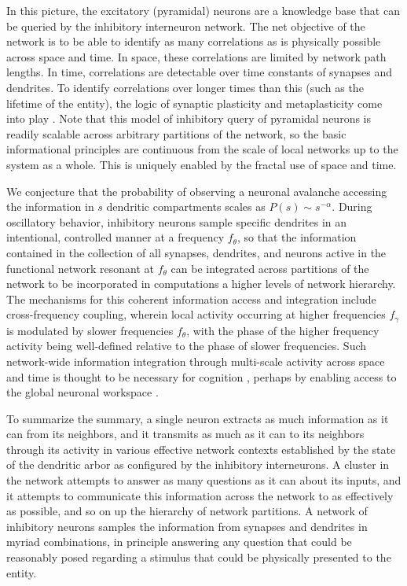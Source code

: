In this picture, the excitatory (pyramidal) neurons are a knowledge base that can be queried by the inhibitory interneuron network. The net objective of the network is to be able to identify as many correlations as is physically possible across space and time. In space, these correlations are limited by network path lengths. In time, correlations are detectable over time constants of synapses and dendrites. To identify correlations over longer times than this (such as the lifetime of the entity), the logic of synaptic plasticity and metaplasticity come into play \cite{fudr2005,fuab2007}. Note that this model of inhibitory query of pyramidal neurons is readily scalable across arbitrary partitions of the network, so the basic informational principles are continuous from the scale of local networks up to the system as a whole. This is uniquely enabled by the fractal use of space and time.

We conjecture that the probability of observing a neuronal avalanche accessing the information in $s$ dendritic compartments scales as $P(s)\sim s^{-\alpha}$. During oscillatory behavior, inhibitory neurons sample specific dendrites in an intentional, controlled manner at a frequency $f_{\theta}$, so that the information contained in the collection of all synapses, dendrites, and neurons active in the functional network resonant at $f_{\theta}$ can be integrated across partitions of the network to be incorporated in computations a higher levels of network hierarchy. The mechanisms for this coherent information access and integration include cross-frequency coupling, wherein local activity occurring at higher frequencies $f_{\gamma}$ is modulated by slower frequencies $f_{\theta}$, with the phase of the higher frequency activity being well-defined relative to the phase of slower frequencies. Such network-wide information integration through multi-scale activity across space and time is thought to be necessary for cognition \cite{bu2006}, perhaps by enabling access to the global neuronal workspace \cite{ba1988,de2014}.

To summarize the summary, a single neuron extracts as much information as it can from its neighbors, and it transmits as much as it can to its neighbors through its activity in various effective network contexts established by the state of the dendritic arbor as configured by the inhibitory interneurons. A cluster in the network attempts to answer as many questions as it can about its inputs, and it attempts to communicate this information across the network to as effectively as possible, and so on up the hierarchy of network partitions. A network of inhibitory neurons samples the information from synapses and dendrites in myriad combinations, in principle answering any question that could be reasonably posed regarding a stimulus that could be physically presented to the entity. 

